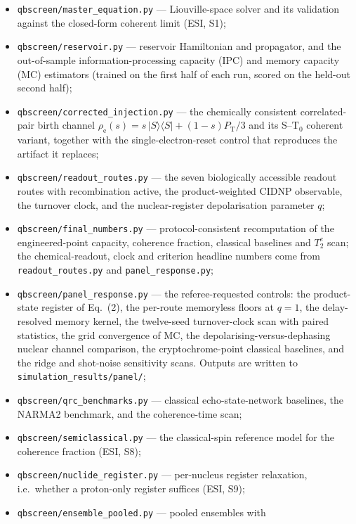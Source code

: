 \documentclass[11pt,a4paper]{article}
\begin{document}
\begin{itemize}\setlength{\itemsep}{2pt}
\item \texttt{qbscreen/master\_equation.py} --- Liouville-space solver and its
validation against the closed-form coherent limit (ESI, S1);
\item \texttt{qbscreen/reservoir.py} --- reservoir Hamiltonian and propagator, and
the out-of-sample information-processing capacity (IPC) and memory capacity (MC)
estimators (trained on the first half of each run, scored on the held-out second
half);
\item \texttt{qbscreen/corrected\_injection.py} --- the chemically consistent
correlated-pair birth channel $\rho_{\mathrm e}(s)=s\,|S\rangle\langle S|
+(1-s)P_{\mathrm T}/3$ and its S--$\mathrm{T}_0$ coherent variant, together with the
single-electron-reset control that reproduces the artifact it replaces;
\item \texttt{qbscreen/readout\_routes.py} --- the seven biologically accessible
readout routes with recombination active, the product-weighted CIDNP observable, the
turnover clock, and the nuclear-register depolarisation parameter $q$;
\item \texttt{qbscreen/final\_numbers.py} --- protocol-consistent recomputation of
the engineered-point capacity, coherence fraction, classical baselines and $T_2^e$
scan; the chemical-readout, clock and criterion headline numbers come from
\texttt{readout\_routes.py} and \texttt{panel\_response.py};
\item \texttt{qbscreen/panel\_response.py} --- the referee-requested controls:
the product-state register of Eq.~(2), the per-route memoryless floors at $q=1$,
the delay-resolved memory kernel, the twelve-seed turnover-clock scan with paired
statistics, the grid convergence of MC, the depolarising-versus-dephasing nuclear
channel comparison, the cryptochrome-point classical baselines, and the ridge and
shot-noise sensitivity scans. Outputs are written to
\texttt{simulation\_results/panel/};
\item \texttt{qbscreen/qrc\_benchmarks.py} --- classical echo-state-network
baselines, the NARMA2 benchmark, and the coherence-time scan;
\item \texttt{qbscreen/semiclassical.py} --- the classical-spin reference model
for the coherence fraction (ESI, S8);
\item \texttt{qbscreen/nuclide\_register.py} --- per-nucleus register relaxation,
i.e.\ whether a proton-only register suffices (ESI, S9);
\item \texttt{qbscreen/ensemble\_pooled.py} --- pooled ensembles with

\end{itemize}
\end{document}
